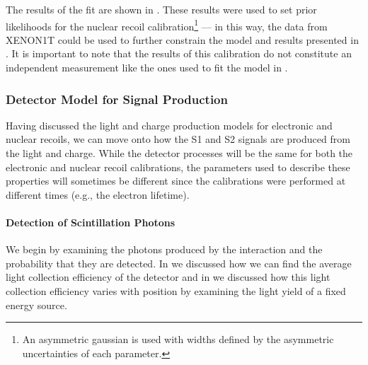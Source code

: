 The results of the fit are shown in .  These results were used to set prior likelihoods for the nuclear recoil calibration\footnote{An asymmetric gaussian is used with widths defined by the asymmetric uncertainties of each parameter.} --- in this way, the data from XENON1T could be used to further constrain the model and results presented in .  It is important to note that the results of this calibration do not constitute an independent measurement like the ones used to fit the model in . 


\subsubsection{Detector Model for Signal Production}
\label{sec:xe1t_mc_detector}

Having discussed the light and charge production models for electronic and nuclear recoils, we can move onto how the S1 and S2 signals are produced from the light and charge.  While the detector processes will be the same for both the electronic and nuclear recoil calibrations, the parameters used to describe these properties will sometimes be different since the calibrations were performed at different times (e.g., the electron lifetime).




\paragraph{Detection of Scintillation Photons}

We begin by examining the photons produced by the interaction and the probability that they are detected.  In  we discussed how we can find the average light collection efficiency of the detector and in  we discussed how this light collection efficiency varies with position by examining the light yield of a fixed energy source.  

